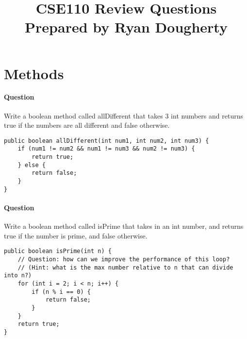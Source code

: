 \documentclass{article}
\date{}
\begin{document}
\title{\textbf{CSE110 Review Questions \\
Prepared by Ryan Dougherty}}
\maketitle

\section*{Methods}


\setcounter{question_num}{1}
\paragraph{Question }
Write a boolean method called allDifferent that takes 3 int numbers and returns true if the numbers are all different and false otherwise.
\begin{lstlisting}
public boolean allDifferent(int num1, int num2, int num3) {
	if (num1 != num2 && num1 != num3 && num2 != num3) {
		return true;
	} else {
		return false;
	}
}
\end{lstlisting}

\addtocounter{question_num}{1}
\paragraph{Question }
Write a boolean method called isPrime that takes in an int number, and returns true if the number is prime, and false otherwise.
\begin{lstlisting}
public boolean isPrime(int n) {
	// Question: how can we improve the performance of this loop? 
	// (Hint: what is the max number relative to n that can divide into n?)
	for (int i = 2; i < n; i++) {
		if (n % i == 0) {
			return false;
		}
	}
	return true;
}
\end{lstlisting}

\addtocounter{question_num}{1}
\end{document}
